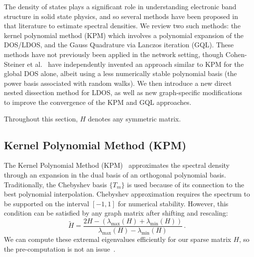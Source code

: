 The density of states plays a significant role in understanding electronic band
structure in solid state physics, and so several methods have been proposed in
that literature to estimate spectral densities. We review two such methods: the
kernel polynomial method (KPM) which involves a polynomial expansion of the
DOS/LDOS, and the Gauss Quadrature via Lanczos iteration (GQL). These methods
have not previously been applied in the network setting, though Cohen-Steiner et
al.~\cite{cohen2018approximating} have independently invented an approach
similar to KPM for the global DOS alone, albeit using a less numerically stable
polynomial basis (the power basis associated with random walks). We then
introduce a new direct nested dissection method for LDOS, as well as new
graph-specific modifications to improve the convergence of the KPM and GQL
approaches.

Throughout this section, $H$ denotes any symmetric matrix.

\subsection{Kernel Polynomial Method (KPM)}\label{subsec:kpm}

The Kernel Polynomial Method (KPM)~\cite{weisse2006kernel} approximates the
spectral density through an expansion in the dual basis of an orthogonal
polynomial basis. Traditionally, the Chebyshev basis $\{T_m\}$ is used because
of its connection to the best polynomial interpolation. Chebyshev approximation
requires the spectrum to be supported on the interval $[-1,1]$ for numerical
stability. However, this condition can be satisfied by any graph matrix after
shifting and rescaling:
\begin{equation}\label{eqn:shiftscale}
	\widetilde{H} = \frac{2H - (\lambda_{\max}(H)+\lambda_{\min}(H))}{\lambda_
	{\max}(H) - \lambda_{\min}(H)}\,.
\end{equation}
We can compute these extremal eigenvalues efficiently for our sparse matrix $H$,
so the pre-computation is not an issue~\cite{Parlett-1984-sparse}.

